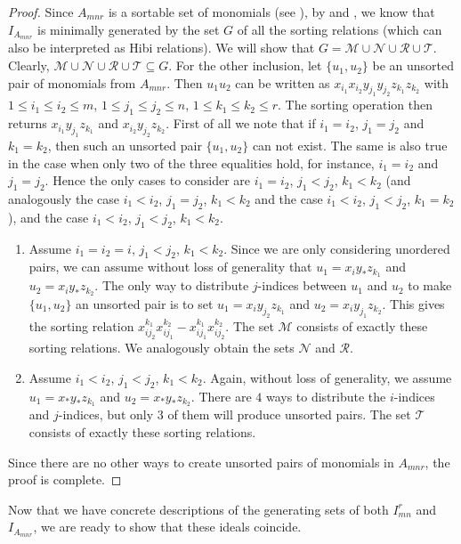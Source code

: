 \documentclass[12pt]{amsart}
\numberwithin{equation}{section}
\theoremstyle{definition}
\begin{document}
\begin{proof}
Since  $A_{mnr}$ is a sortable set of monomials (see ), by  and , we know that $I_{A_{mnr}}$ is minimally generated by the set $G$ of all the sorting relations (which can also be interpreted as Hibi relations). We will show that $G=\mathcal M\cup \mathcal N\cup\mathcal R\cup\mathcal T$. Clearly, $\mathcal M\cup \mathcal N\cup\mathcal R\cup\mathcal T\subseteq G$. For the other inclusion, let $\{u_1, u_2\}$ be an unsorted pair of monomials from $A_{mnr}$. Then $u_1u_2$ can be written as
$x_{i_1}x_{i_2}y_{j_1}y_{j_2}z_{k_1}z_{k_2}$ with $1\le i_1\le i_2\le m$, $1\le j_1\le j_2\le n$, $1\le k_1\le k_2\le r$. The sorting operation then returns $x_{i_1}y_{j_1}z_{k_1}$ and $x_{i_2}y_{j_2}z_{k_2}$. First of all we note that if $i_1=i_2$, $j_1=j_2$ and $k_1=k_2$, then such an unsorted pair $\{u_1,u_2\}$ can not exist. The same is also true in the case when only two of the three equalities hold, for instance, $i_1=i_2$ and $j_1=j_2$. Hence the only cases to consider are $i_1=i_2$, $j_1<j_2$, $k_1<k_2$ (and analogously the case $i_1<i_2$, $j_1=j_2$, $k_1<k_2$ and the case $i_1<i_2$, $j_1<j_2$, $k_1=k_2$), and the case $i_1<i_2$, $j_1<j_2$, $k_1<k_2$.
\begin{enumerate}
    \item Assume $i_1=i_2=i$, $j_1<j_2$, $k_1<k_2$. Since we are only considering unordered pairs, we can assume without loss of generality that $u_1=x_iy_*z_{k_1}$ and $u_2=x_iy_*z_{k_2}$. The only way to distribute $j$-indices between $u_1$ and $u_2$ to make $\{u_1,u_2\}$ an unsorted pair is to set $u_1=x_iy_{j_2}z_{k_1}$ and $u_2=x_iy_{j_1}z_{k_2}$. This gives the sorting relation $x_{ij_2}^{k_1}x_{ij_1}^{k_2}-x_{ij_1}^{k_1}x_{ij_2}^{k_2}$. The set $\mathcal{M}$ consists of exactly these sorting relations. We analogously obtain the sets $\mathcal{N}$ and $\mathcal{R}$.
    \item Assume $i_1<i_2$, $j_1<j_2$, $k_1<k_2$. Again, without loss of generality, we assume $u_1=x_*y_*z_{k_1}$ and $u_2=x_*y_*z_{k_2}$. There are $4$ ways to distribute the $i$-indices and $j$-indices, but only $3$ of them will produce unsorted pairs. The set $\mathcal{T}$ consists of exactly these sorting relations.
\end{enumerate}
Since there are no other ways to create unsorted pairs of monomials in $A_{mnr}$, the proof is complete.
\end{proof}

Now that we have concrete descriptions of the generating sets of both $I_{mn}^r$ and $I_{A_{mnr}}$, we are ready to show that these ideals coincide.
\end{document}
